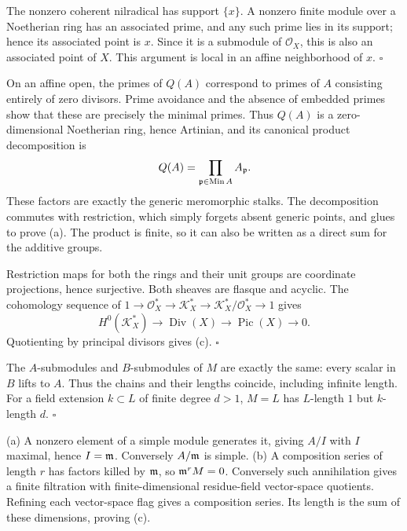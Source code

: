 \documentclass[11pt]{article}
\let\chapterexercise\exercise
\renewcommand{\exercise}[2]{\Needspace{8\baselineskip}\chapterexercise{#1}{#2}}
\begin{document}
\pf
The nonzero coherent nilradical has support $\{x\}$. A nonzero finite module over a Noetherian ring has an associated prime, and any such prime lies in its support; hence its associated point is $x$. Since it is a submodule of $\mathcal O_X$, this is also an associated point of $X$. This argument is local in an affine neighborhood of $x$. \hfill$\square$

\pf
On an affine open, the primes of $Q(A)$ correspond to primes of $A$ consisting entirely of zero divisors. Prime avoidance and the absence of embedded primes show that these are precisely the minimal primes. Thus $Q(A)$ is a zero-dimensional Noetherian ring, hence Artinian, and its canonical product decomposition is
\[ Q(A)=\prod_{\mathfrak p\in\operatorname{Min}A}A_\mathfrak p. \]
These factors are exactly the generic meromorphic stalks. The decomposition commutes with restriction, which simply forgets absent generic points, and glues to prove (a). The product is finite, so it can also be written as a direct sum for the additive groups.

Restriction maps for both the rings and their unit groups are coordinate projections, hence surjective. Both sheaves are flasque and acyclic. The cohomology sequence of $1\to\mathcal O_X^*\to\mathcal K_X^*\to\mathcal K_X^*/\mathcal O_X^*\to1$ gives
\[ H^0(\mathcal K_X^*)\to\operatorname{Div}(X)\to\operatorname{Pic}(X)\to0. \]
Quotienting by principal divisors gives (c). \hfill$\square$

\pf
The $A$-submodules and $B$-submodules of $M$ are exactly the same: every scalar in $B$ lifts to $A$. Thus the chains and their lengths coincide, including infinite length. For a field extension $k\subset L$ of finite degree $d>1$, $M=L$ has $L$-length $1$ but $k$-length $d$. \hfill$\square$

\pf
(a) A nonzero element of a simple module generates it, giving $A/I$ with $I$ maximal, hence $I=\mathfrak m$. Conversely $A/\mathfrak m$ is simple. (b) A composition series of length $r$ has factors killed by $\mathfrak m$, so $\mathfrak m^rM=0$. Conversely such annihilation gives a finite filtration with finite-dimensional residue-field vector-space quotients. Refining each vector-space flag gives a composition series. Its length is the sum of these dimensions, proving (c).
\end{document}
